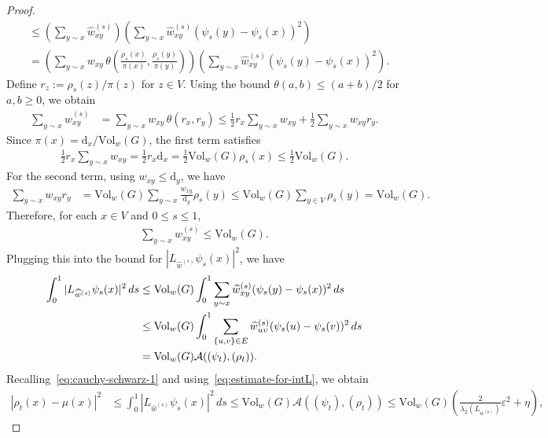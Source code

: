 \documentclass[11pt,a4paper]{article}
\newcommand{\Deg}{\mathrm{d}}
\newcommand{\Vol}{\mathrm{Vol}}
\begin{document}
\begin{proof}
\begin{align*}
            &\leq  \left(\sum_{y\sim x} \widehat{w}^{(s)}_{xy} \right)\left(\sum_{y\sim x} \widehat{w}^{(s)}_{xy} (\psi_s(y) - \psi_s(x))^2 \right)\\
            &= \left(\sum_{y\sim x} w_{xy}\, \theta\left(\frac{\rho_s(x)}{\pi(x)}, \frac{\rho_s(y)}{\pi(y)}\right) \right)\left(\sum_{y\sim x} \widehat{w}^{(s)}_{xy} (\psi_s(y) - \psi_s(x))^2 \right).
        \end{align*}
    Define $r_z := \rho_s(z)/\pi(z)$ for $z\in V$. Using the bound $\theta(a,b)\le (a+b)/2$ for $a,b\ge 0$, we obtain
        \begin{align*}
            \sum_{y\sim x}\widehat{w}^{(s)}_{xy}
            &= \sum_{y\sim x} w_{xy}\,\theta(r_x,r_y)
            \le \frac{1}{2}r_x\sum_{y\sim x}w_{xy} + \frac{1}{2}\sum_{y\sim x}w_{xy}r_y.
        \end{align*}
    Since $\pi(x)=\Deg_x/\Vol_w(G)$, the first term satisfies
        \begin{align*}
            \frac{1}{2}r_x\sum_{y\sim x}w_{xy} = \frac{1}{2}r_x\Deg_x=\frac{1}{2}\Vol_w(G)\rho_s(x) \le \frac{1}{2}\Vol_w(G).
        \end{align*}
    For the second term, using $w_{xy}\le \Deg_y$, we have
        \begin{align*}
            \sum_{y\sim x}w_{xy}r_y
            &= \Vol_w(G)\sum_{y\sim x}\frac{w_{xy}}{\Deg_y}\rho_s(y)
            \le \Vol_w(G)\sum_{y\in V}\rho_s(y)=\Vol_w(G).
        \end{align*}
    Therefore, for each $x\in V$ and $0\le s\le 1$,
        \begin{align*}
            \sum_{y\sim x}\widehat{w}^{(s)}_{xy} \le \Vol_w(G).
        \end{align*}
    Plugging this into the bound for $|L_{\widehat{w}^{(s)}} \psi_s(x)|^2$, we have
        \begin{align}\label{eq:estimate-for-intL}
            \int_0^1 |L_{\widehat{w}^{(s)}} \psi_s(x)|^2\,ds &\leq \Vol_w(G)\int_0^1 \sum_{y\sim x} \widehat{w}^{(s)}_{xy} (\psi_s(y) - \psi_s(x))^2\,ds\notag\\
            &\leq \Vol_w(G)\int_0^1 \sum_{\{u,v\}\in E} \widehat{w}^{(s)}_{uv} (\psi_s(u) - \psi_s(v))^2\,ds\notag\\
            &= \Vol_w(G)\mathcal{A}((\psi_t), (\rho_t)).
        \end{align}
    Recalling~\cref{eq:cauchy-schwarz-1} and using~\cref{eq:estimate-for-intL}, we obtain
        \begin{align*}
            |\rho_t(x) - \mu(x)|^2 &\leq \int_0^1 |L_{\widehat{w}^{(s)}} \psi_s(x)|^2 \, ds \leq \Vol_w(G) \mathcal{A}((\psi_t), (\rho_t)) \leq \Vol_w(G)\left(\frac{2}{\lambda_2(L_{w^{(\mu)}})}\varepsilon^2 + \eta\right),

\end{align*}
\end{proof}
\end{document}

